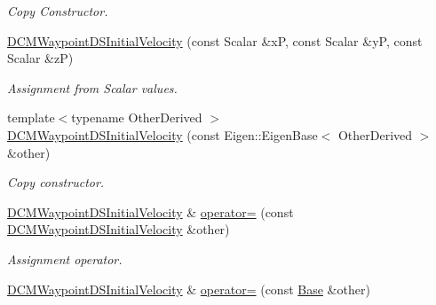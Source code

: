 \begin{DoxyCompactItemize}
\begin{DoxyCompactList}\small\item\em Copy Constructor. \end{DoxyCompactList}\item 
\hyperlink{classow__core_1_1DCMWaypointDSInitialVelocity_a710c238812f970331202bdde0b51f24e}{D\+C\+M\+Waypoint\+D\+S\+Initial\+Velocity} (const Scalar \&xP, const Scalar \&yP, const Scalar \&zP)\hypertarget{classow__core_1_1DCMWaypointDSInitialVelocity_a710c238812f970331202bdde0b51f24e}{}\label{classow__core_1_1DCMWaypointDSInitialVelocity_a710c238812f970331202bdde0b51f24e}

\begin{DoxyCompactList}\small\item\em Assignment from Scalar values. \end{DoxyCompactList}\item 
{\footnotesize template$<$typename Other\+Derived $>$ }\\\hyperlink{classow__core_1_1DCMWaypointDSInitialVelocity_a3f36596416fbc44bbe328cbabb11004a}{D\+C\+M\+Waypoint\+D\+S\+Initial\+Velocity} (const Eigen\+::\+Eigen\+Base$<$ Other\+Derived $>$ \&other)
\begin{DoxyCompactList}\small\item\em Copy constructor. \end{DoxyCompactList}\item 
\hyperlink{classow__core_1_1DCMWaypointDSInitialVelocity}{D\+C\+M\+Waypoint\+D\+S\+Initial\+Velocity} \& \hyperlink{classow__core_1_1DCMWaypointDSInitialVelocity_a27a6198830b536d9ced4676b2da7bb94}{operator=} (const \hyperlink{classow__core_1_1DCMWaypointDSInitialVelocity}{D\+C\+M\+Waypoint\+D\+S\+Initial\+Velocity} \&other)\hypertarget{classow__core_1_1DCMWaypointDSInitialVelocity_a27a6198830b536d9ced4676b2da7bb94}{}\label{classow__core_1_1DCMWaypointDSInitialVelocity_a27a6198830b536d9ced4676b2da7bb94}

\begin{DoxyCompactList}\small\item\em Assignment operator. \end{DoxyCompactList}\item 
\hyperlink{classow__core_1_1DCMWaypointDSInitialVelocity}{D\+C\+M\+Waypoint\+D\+S\+Initial\+Velocity} \& \hyperlink{classow__core_1_1DCMWaypointDSInitialVelocity_a34d716b369dd41fc0ac75551c0e47b01}{operator=} (const \hyperlink{classow__core_1_1LinearVelocity}{Base} \&other)\hypertarget{classow__core_1_1DCMWaypointDSInitialVelocity_a34d716b369dd41fc0ac75551c0e47b01}{}\label{classow__core_1_1DCMWaypointDSInitialVelocity_a34d716b369dd41fc0ac75551c0e47b01}


\end{DoxyCompactItemize}
